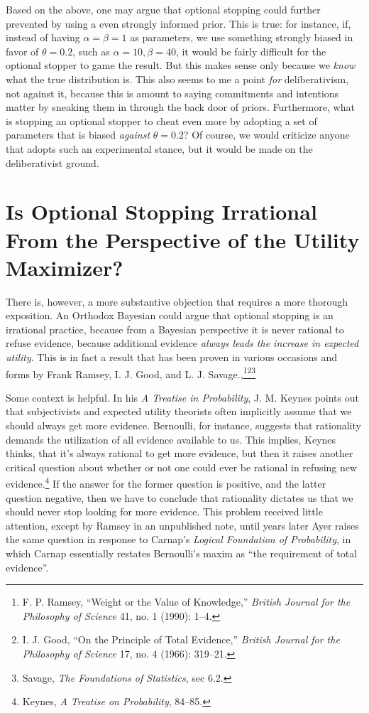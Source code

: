 Based on the above, one may argue that optional stopping could further prevented by using a even strongly informed prior. This is true: for instance, if, instead of
having \(\alpha = \beta = 1\) as parameters, we use something strongly
biased in favor of \(\theta = 0.2\), such as
\(\alpha = 10, \beta = 40\), it would be fairly difficult for the
optional stopper to game the result. But this makes sense only because we \emph{know} what the true distribution is. This also seems to me a point
\emph{for} deliberativism, not against it, because this is amount to
saying commitments and intentions matter by sneaking them in through the
back door of priors. Furthermore, what is stopping an optional stopper
to cheat even more by adopting a set of parameters that is biased
\emph{against} \(\theta = 0.2\)? Of course, we would criticize anyone
that adopts such an experimental stance, but it would be made on the
deliberativist ground.

\hypertarget{is-optional-stopping-irrational-from-the-perspective-of-the-utility-maximizer}{%
\section{Is Optional Stopping Irrational From the Perspective of the
Utility
Maximizer?}\label{is-optional-stopping-irrational-from-the-perspective-of-the-utility-maximizer}}

There is, however, a more substantive objection that requires a more
thorough exposition. An Orthodox Bayesian could argue that optional
stopping is an irrational practice, because from a Bayesian perspective
it is never rational to refuse evidence, because additional evidence
\emph{always leads the increase in expected utility}. This is in fact a
result that has been proven in various occasions and forms by Frank
Ramsey, I. J. Good, and L. J. Savage.,\footnote{F. P. Ramsey, ``Weight
  or the Value of Knowledge,'' \emph{British Journal for the Philosophy
  of Science} 41, no. 1 (1990): 1--4.}\footnote{I. J. Good, ``On the
  Principle of Total Evidence,'' \emph{British Journal for the
  Philosophy of Science} 17, no. 4 (1966): 319--21.}\footnote{Savage,
  \emph{The Foundations of Statistics}, sec 6.2.}

Some context is helpful. In his \emph{A Treatise in Probability}, J. M.
Keynes points out that subjectivists and expected utility theorists
often implicitly assume that we should always get more evidence.
Bernoulli, for instance, suggests that rationality demands the
utilization of all evidence available to us. This implies, Keynes
thinks, that it's always rational to get more evidence, but then it
raises another critical question about whether or not one could ever be
rational in refusing new evidence.\footnote{Keynes, \emph{A Treatise on
  Probability}, 84--85.} If the answer for the former question is
positive, and the latter question negative, then we have to conclude
that rationality dictates us that we should never stop looking for more
evidence. This problem received little attention, except by Ramsey in an
unpublished note, until years later Ayer raises the same question in
response to Carnap's \emph{Logical Foundation of Probability}, in which
Carnap essentially restates Bernoulli's maxim as ``the requirement of
total evidence''.


